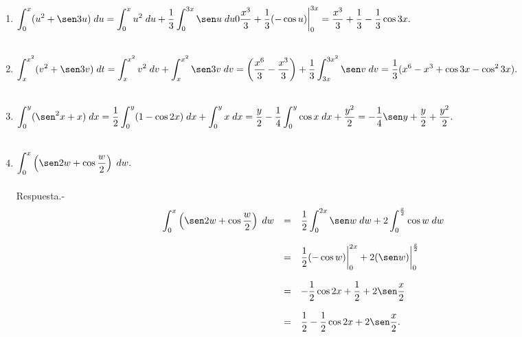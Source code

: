 \begin{enumerate}[\bfseries  1.]
    \item $\displaystyle\int_0^x (u^2 + \sen 3u)\; du = \int_0^x u^2\; du + \dfrac{1}{3}\int_0^{3x}\sen u\; du 0 \dfrac{x^3}{3}+\dfrac{1}{3}(-\cos u)\bigg|_0^{3x} = \dfrac{x^3}{3}+\dfrac{1}{3}-\dfrac{1}{3}\cos 3x.$\\\\

    \item $\displaystyle\int_x^{x^2}(v^2 + \sen 3v)\; dt = \int_x^{x^2}v^2\; dv + \int_x^{x^2}\sen 3v\; dv = \left(\dfrac{x^6}{3}-\dfrac{x^3}{3}\right)+\dfrac{1}{3}\int_{3x}^{3x^2}\sen v\; dv = \dfrac{1}{3}(x^6-x^3+\cos3x - \cos^2 3x).$\\\\

    \item $\displaystyle\int_0^y (\sen^2x+x)\; dx = \dfrac{1}{2}\int_0^y (1-\cos2x)\; dx + \int_0^y x\; dx = \dfrac{y}{2}-\dfrac{1}{4}\int_0^y \cos x \; dx + \dfrac{y^2}{2} = -\dfrac{1}{4}\sen y + \dfrac{y}{2} + \dfrac{y^2}{2}.$\\\\

    \item $\displaystyle\int_0^x \left(\sen 2w + \cos \dfrac{w}{2}\right)\; dw.$\\\\
	Respuesta.-\;
	$$\begin{array}{rcl}
	    \displaystyle\int_0^x \left(\sen 2w + \cos \dfrac{w}{2}\right)\; dw&=&\displaystyle\dfrac{1}{2}\int_0^{2x}\sen w\; dw + 2\int_0^{\frac{x}{2}}\cos w\; dw\\\\
									       &=&\dfrac{1}{2}(-\cos w)\bigg|_0^{2x} + 2(\sen w)\bigg|_0^{\frac{x}{2}}\\\\
									       &=&-\dfrac{1}{2}\cos 2x +\dfrac{1}{2}+2\sen \dfrac{x}{2}\\\\
									       &=&\dfrac{1}{2}-\dfrac{1}{2}\cos 2x +2\sen \dfrac{x}{2}.\\\\
	\end{array}$$


\end{enumerate}
